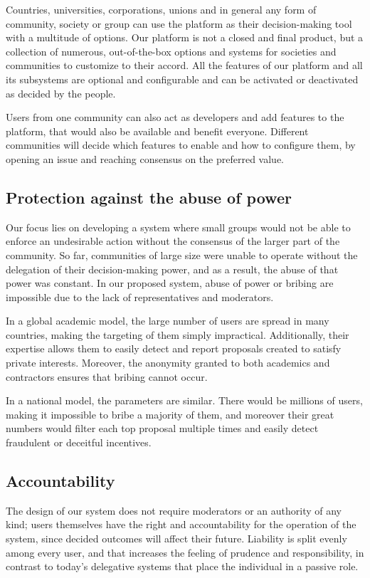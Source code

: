 \documentclass[a4paper,11pt]{article}
\begin{document}
\begin{multicols}{2}
Countries, universities, corporations, unions and in general any form of community, society or group can use the platform as their decision-making tool with a multitude of options. Our platform is not a closed and final product, but a collection of numerous, out-of-the-box options and systems for societies and communities to customize to their accord. All the features of our platform and all its subsystems are optional and configurable and can be activated or deactivated as decided by the people.

Users from one community can also act as developers and add features to the platform, that would also be available and benefit everyone. Different communities will decide which features to enable and how to configure them, by opening an issue and reaching consensus on the preferred value.

\subsection{Protection against the abuse of power} \label{abuse}

Our focus lies on developing a system where small groups would not be able to enforce an undesirable action without the consensus of the larger part of the community. So far, communities of large size were unable to operate without the delegation of their decision-making power, and as a result, the abuse of that power was constant. In our proposed system, abuse of power or bribing are impossible due to the lack of representatives and moderators.

In a global academic model, the large number of users are spread in many countries, making the targeting of them simply impractical. Additionally, their expertise allows them to easily detect and report proposals created to satisfy private interests. Moreover, the anonymity granted to both academics and contractors ensures that bribing cannot occur.

In a national model, the parameters are similar. There would be millions of users, making it impossible to bribe a majority of them, and moreover their great numbers would filter each top proposal multiple times and easily detect fraudulent or deceitful incentives.

\subsection{Accountability} \label{accountability}

The design of our system does not require moderators or an authority of any kind; users themselves have the right and accountability for the operation of the system, since decided outcomes will affect their future. Liability is split evenly among every user, and that increases the feeling of prudence and responsibility, in contrast to today's delegative systems that place the individual in a passive role.


\end{multicols}
\end{document}
